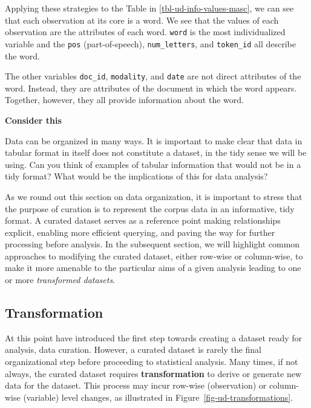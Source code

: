 \documentclass[
  letterpaper,
]{latex/krantz}
\theoremstyle{definition}
\theoremstyle{remark}
\begin{document}
Applying these strategies to the Table in \ref{tbl-ud-info-values-masc},
we can see that each observation at its core is a word. We see that the
values of each observation are the attributes of each word.
\texttt{word} is the most individualized variable and the \texttt{pos}
(part-of-speech), \texttt{num\_letters}, and \texttt{token\_id} all
describe the word.

The other variables \texttt{doc\_id}, \texttt{modality}, and
\texttt{date} are not direct attributes of the word. Instead, they are
attributes of the document in which the word appears. Together, however,
they all provide information about the word.

\begin{tcolorbox}[enhanced jigsaw, breakable, leftrule=.75mm, arc=.35mm, colframe=quarto-callout-color-frame, colback=white, left=2mm, bottomrule=.15mm, rightrule=.15mm, toprule=.15mm, opacityback=0]

\textbf{ Consider this}

Data can be organized in many ways. It is important to make clear that
data in tabular format in itself does not constitute a dataset, in the
tidy sense we will be using. Can you think of examples of tabular
information that would not be in a tidy format? What would be the
implications of this for data analysis?

\end{tcolorbox}

As we round out this section on data organization, it is important to
stress that the purpose of curation is to represent the corpus data in
an informative, tidy format. A curated dataset serves as a reference
point making relationships explicit, enabling more efficient querying,
and paving the way for further processing before analysis. In the
subsequent section, we will highlight common approaches to modifying the
curated dataset, either row-wise or column-wise, to make it more
amenable to the particular aims of a given analysis leading to one or
more \emph{transformed datasets}.

\subsection{Transformation}\label{sec-ud-transformation}

At this point have introduced the first step towards creating a dataset
ready for analysis, data curation. However, a curated dataset is rarely
the final organizational step before proceeding to statistical analysis.
Many times, if not always, the curated dataset requires
\textbf{transformation} to derive or generate new data for the dataset.
This process may incur row-wise (observation) or column-wise (variable)
level changes, as illustrated in Figure~\ref{fig-ud-transformations}.
\end{document}
